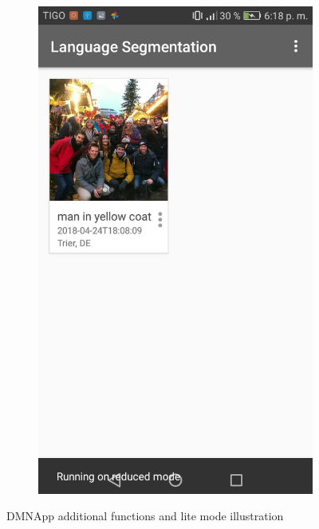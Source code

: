 \begin{figure}[!htbp]
\begin{multicols}{3}
    \begin{subfigure}[b]{\columnwidth}
            \centering
            \includegraphics[width=\textwidth]{./figures/dmn_app/views/17.png}
    \label{subfig:limited}
    \end{subfigure}
    \end{multicols}
    \caption{DMNApp additional functions and lite mode illustration}
    \label{Fig:Additional}
\end{figure}


